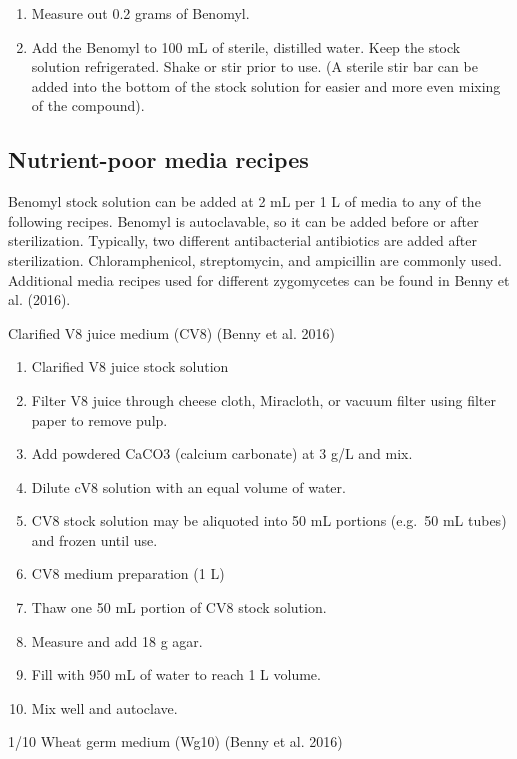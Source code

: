 \documentclass[]{book}
\providecommand{\tightlist}{%
  \setlength{\itemsep}{0pt}\setlength{\parskip}{0pt}}
\begin{document}
\begin{enumerate}
\def\labelenumi{\arabic{enumi}.}
\tightlist
\item
  Measure out 0.2 grams of Benomyl.
\item
  Add the Benomyl to 100 mL of sterile, distilled water. Keep the stock
  solution refrigerated. Shake or stir prior to use. (A sterile stir bar
  can be added into the bottom of the stock solution for easier and more
  even mixing of the compound).
\end{enumerate}

\subsection{Nutrient-poor media
recipes}\label{nutrient-poor-media-recipes}

Benomyl stock solution can be added at 2 mL per 1 L of media to any of
the following recipes. Benomyl is autoclavable, so it can be added
before or after sterilization. Typically, two different antibacterial
antibiotics are added after sterilization. Chloramphenicol,
streptomycin, and ampicillin are commonly used. Additional media recipes
used for different zygomycetes can be found in Benny et al. (2016).

{Clarified V8 juice medium} (CV8) (Benny et al. 2016)

\begin{enumerate}
\def\labelenumi{\arabic{enumi}.}
\tightlist
\item
  Clarified V8 juice stock solution
\item
  Filter V8 juice through cheese cloth, Miracloth, or vacuum filter
  using filter paper to remove pulp.
\item
  Add powdered CaCO3 (calcium carbonate) at 3 g/L and mix.
\item
  Dilute cV8 solution with an equal volume of water.
\item
  CV8 stock solution may be aliquoted into 50 mL portions (e.g.~50 mL
  tubes) and frozen until use.
\item
  CV8 medium preparation (1 L)
\item
  Thaw one 50 mL portion of CV8 stock solution.
\item
  Measure and add 18 g agar.
\item
  Fill with 950 mL of water to reach 1 L volume.
\item
  Mix well and autoclave.
\end{enumerate}

{1/10 Wheat germ medium} (Wg10) (Benny et al. 2016)
\end{document}
